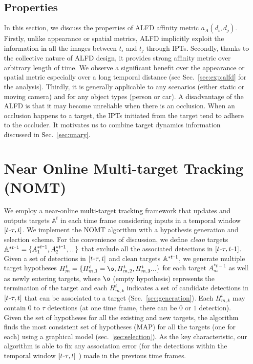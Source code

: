 \documentclass[10pt,twocolumn,letterpaper]{article}
\newcommand{\minus}{\scalebox{0.5}[1.0]{$-$}}
\begin{document}
\subsection{Properties}
In this section, we discuss the properties of ALFD affinity metric $a_{A}(d_i, d_j)$. Firstly, unlike appearance or spatial metrics, ALFD implicitly exploit the information in all the images between $t_i$ and $t_j$ through IPTs. Secondly, thanks to the collective nature of ALFD design, it provides strong affinity metric over arbitrary length of time. We observe a significant benefit over the appearance or spatial metric especially over a long temporal distance (see Sec.~\ref{sec:exp:alfd} for the analysis). Thirdly, it is generally applicable to any scenarios (either static or moving camera) and for any object types (person or car). A disadvantage of the ALFD is that it may become unreliable when there is an occlusion. When an occlusion happens to a target, the IPTs initiated from the target tend to adhere to the occluder. It motivates us to combine target dynamics information discussed in Sec.~\ref{sec:unary}.



\section{Near Online Multi-target Tracking (NOMT)}
\label{sec:method}
We employ a near-online multi-target tracking framework that updates and outputs targets $\mathbb{A}^t$ in each time frame considering inputs in a temporal window $[t \minus \tau, t]$. We implement the NOMT algorithm with a hypothesis generation and selection scheme. 
For the convenience of discussion, we define \emph{clean} targets $\mathbb{A}^{* t \minus 1} = \{A_1^{* t \minus 1}, A_2^{* t \minus 1}, ...\}$ that exclude all the associated detections in $[t \minus \tau, t \minus 1]$.
Given a set of detections in $[t \minus \tau, t]$ and clean targets $\mathbb{A}^{* t \minus 1}$, we generate multiple target hypotheses $H_m^t = \{ H_{m, 1}^t = \o, H_{m, 2}^t, H_{m, 3}^t ... \}$ for each target $A_m^{*t-1}$ as well as newly entering targets, where $\o$ (empty hypothesis) represents the termination of the target and each $H_{m, k}^t$ indicates a set of candidate detections in $[t \minus \tau, t]$ that can be associated to a target  (Sec.~\ref{sec:generation}). Each $H_{m, k}^t$ may contain $0$ to $\tau$ detections (at one time frame, there can be $0$ or $1$ detection).
Given the set of hypotheses for all the existing and new targets, the algorithm finds the most consistent set of hypotheses (MAP) for all the targets (one for each) using a graphical model (sec.~\ref{sec:selection}). As the key characteristic, our algorithm is able to fix any association error (for the detections within the temporal window $[t \minus \tau, t]$ ) made in the previous time frames.
\end{document}

